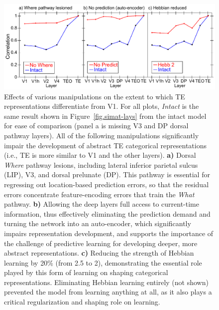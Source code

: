 \documentclass[11pt,twoside]{article}
\newif\myifpdf
\begin{document}
\begin{figure}
  \centering\includegraphics[width=5in]{fig_deepleabra_wwi_leabra_manips}
  \caption{\footnotesize Effects of various manipulations on the extent to which TE representations differentiate from V1.  For all plots, \emph{Intact} is the same result shown in Figure~\ref{fig.simat-lays} from the intact model for ease of comparison (panel a is missing V3 and DP dorsal pathway layers).  All of the following  manipulations significantly impair the development of abstract TE categorical representations (i.e., TE is more similar to V1 and the other layers).  {\bf a)} Dorsal \emph{Where} pathway lesions, including lateral inferior parietal sulcus (LIP), V3, and dorsal prelunate (DP).  This pathway is essential for regressing out location-based prediction errors, so that the residual errors concentrate feature-encoding errors that train the \emph{What} pathway.  {\bf b)} Allowing the deep layers full access to current-time information, thus effectively eliminating the prediction demand and turning the network into an auto-encoder, which significantly impairs representation development, and supports the importance of the challenge of predictive learning for developing deeper, more abstract representations.  {\bf c)} Reducing the strength of Hebbian learning by 20\% (from 2.5 to 2), demonstrating the essential role played by this form of learning on shaping categorical representations.  Eliminating Hebbian learning entirely (not shown) prevented the model from learning anything at all, as it also plays a critical regularization and shaping role on learning.}
  \label{fig.manips}
\end{figure}
\end{document}
